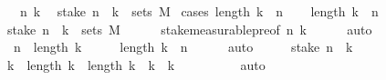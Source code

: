 \begin{isabellebody}
\ \ \ n\ k\isanewline
\ \ stake\ n\ {\isacharminus}{\kern0pt}{\isacharbackquote}{\kern0pt}\ {\isacharbraceleft}{\kern0pt}k{\isacharbraceright}{\kern0pt}{\isacharparenright}{\kern0pt}\ {\isasymin}\ sets\ M{\isachardoublequoteclose}\isanewline
%
\isadelimproof
%
\endisadelimproof
%
\isatagproof
{}\isamarkupfalse%
\ {\isacharparenleft}{\kern0pt}cases\ {\isachardoublequoteopen}length\ k\ {\isasymge}\ n{\isachardoublequoteclose}{\isacharparenright}{\kern0pt}\isanewline
\ \ \isamarkupfalse%
\ {\isachardoublequoteopen}length\ k\ {\isasymge}\ n{\isachardoublequoteclose}\isanewline
\ \ \isamarkupfalse%
\ \isamarkupfalse%
\ {\isachardoublequoteopen}{\isacharparenleft}{\kern0pt}stake\ n\ {\isacharminus}{\kern0pt}{\isacharbackquote}{\kern0pt}\ {\isacharbraceleft}{\kern0pt}k{\isacharbraceright}{\kern0pt}{\isacharparenright}{\kern0pt}\ {\isasymin}\ sets\ M{\isachardoublequoteclose}\isanewline
\ \ \ \ \isamarkupfalse%
\ stake{\isacharunderscore}{\kern0pt}measurable{\isacharunderscore}{\kern0pt}pre{\isacharbrackleft}{\kern0pt}of\ n\ k{\isacharbrackright}{\kern0pt}\isanewline
\ \ \ \ \isamarkupfalse%
\ auto\isanewline
{}\isamarkupfalse%
\ \isanewline
\ \ \isamarkupfalse%
\ {\isachardoublequoteopen}{\isasymnot}\ n\ {\isasymle}\ length\ k{\isachardoublequoteclose}\isanewline
\ \ \isamarkupfalse%
\ \isamarkupfalse%
\ {\isachardoublequoteopen}length\ k\ {\isacharless}{\kern0pt}\ n{\isachardoublequoteclose}\isanewline
\ \ \ \ \isamarkupfalse%
\ auto\isanewline
\ \ \isamarkupfalse%
\ \isamarkupfalse%
\ {\isachardoublequoteopen}stake\ n\ {\isacharminus}{\kern0pt}{\isacharbackquote}{\kern0pt}\ {\isacharbraceleft}{\kern0pt}k{\isacharbraceright}{\kern0pt}\ {\isacharequal}{\kern0pt}\ {\isacharbraceleft}{\kern0pt}{\isacharbraceright}{\kern0pt}{\isachardoublequoteclose}\isanewline
\ \ \ \ \isamarkupfalse%
{\isacharminus}{\kern0pt}\isanewline
\ \ \ \ \ \ \isamarkupfalse%
\ {\isachardoublequoteopen}{\isasymAnd}k{}\ {\isachardot}{\kern0pt}\ length\ k{}\ {\isachargreater}{\kern0pt}\ length\ k\ {\isasymLongrightarrow}\ k{}\ {\isasymnoteq}\ k{\isachardoublequoteclose}\isanewline
\ \ \ \ \ \ \ \ \isamarkupfalse%
\ auto\isanewline
\ \ \ \ \ \ \isamarkupfalse%
\ \isamarkupfalse%

\end{isabellebody}
